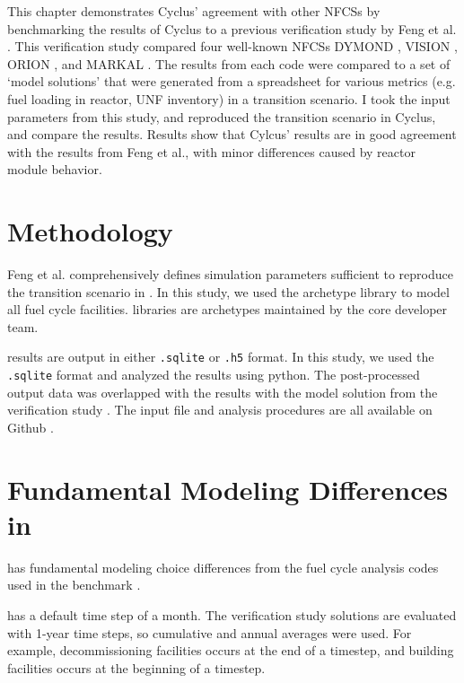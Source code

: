 This chapter demonstrates Cyclus' agreement with other
\glspl{NFCS} by benchmarking the results of Cyclus to
a previous verification study by Feng et al. \cite{feng_standardized_2016}.
This verification study compared four well-known \glspl{NFCS}
DYMOND \cite{yacout_modeling_2005},
VISION \cite{jacobson_verifiable_2010},
ORION \cite{gregg_analysis_2012}, and
MARKAL \cite{shay_epa_2006}. The results from each code were compared to a
set of `model solutions' that were generated from a spreadsheet
for various metrics (e.g. fuel loading in reactor, \gls{UNF} inventory)
in a transition scenario. I took the input parameters from this study,
and reproduced the transition scenario in Cyclus, and compare the results.
Results show that Cylcus' results are in good agreement with the results
from Feng et al., with minor differences caused by reactor module behavior.

\section{Methodology}

Feng et al. comprehensively defines simulation parameters
sufficient to reproduce the transition scenario in \Cyclus.
In this study, we used the \Cycamore \cite{huff_fundamental_2016}
archetype library to model
all fuel cycle facilities. \Cycamore libraries are
archetypes maintained by the core developer team.

\Cyclus results are output in either \texttt{.sqlite} or
\texttt{.h5} format. In this study, we used the
\texttt{.sqlite} format and analyzed the results
using python. The post-processed
output data was overlapped with the results with the
model solution from the verification study \cite{feng_standardized_2016}.
The input file and analysis procedures are all available on Github \cite{bae_arfc/transition-scenarios:_2018}.


\section{Fundamental Modeling Differences in \Cyclus}

\Cyclus has fundamental modeling choice differences from the fuel cycle analysis codes
used in the benchmark \cite{feng_standardized_2016}.

\Cyclus has a default time step of a month.
The verification study solutions are evaluated with 1-year time steps, so cumulative and annual averages
were used. For example, decommissioning
facilities occurs at the end of a timestep, and building facilities
occurs at the beginning of a timestep.

